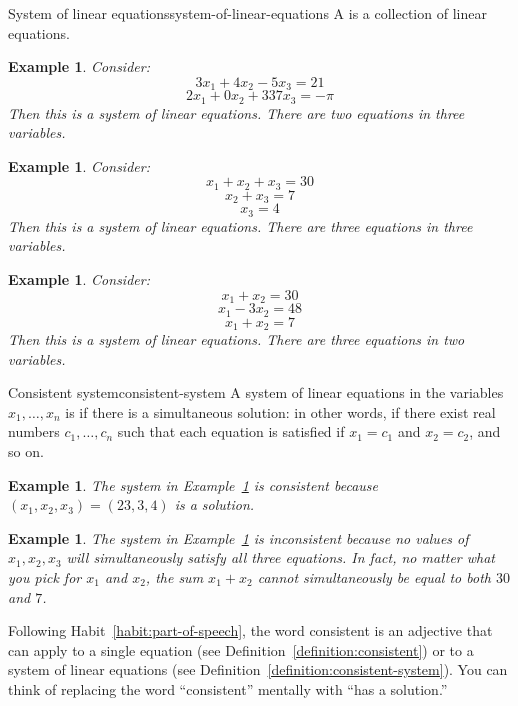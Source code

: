 \documentclass{book}
\newcounter{ekcounter}%
\theoremstyle{ekimcustom}
\newtheorem{example}[ekcounter]{Example}
\newcommand\defn[1]{{\color{blue}{\bf #1}}}
\begin{document}
\begin{bdefinition}{System of linear equations}{system-of-linear-equations}
A \defn{system of linear equations} is a collection of linear equations.
\end{bdefinition}
\begin{example}
Consider:
\[ 3x_1 + 4x_2 - 5x_3 = 21 \]
\[ 2x_1 + 0x_2 + 337x_3 = -\pi \]
Then this is a system of linear equations. There are two equations in three variables.
\end{example}
\begin{example}\label{example:triangular-system}
Consider:
\[ x_1+x_2+x_3= 30 \]
\[ x_2+x_3= 7 \]
\[ x_3= 4 \]
Then this is a system of linear equations. There are three equations in three variables.
\end{example}
\begin{example}\label{example:inconsistent}
Consider:
\[ x_1+x_2= 30 \]
\[ x_1-3x_2= 48 \]
\[ x_1+x_2= 7 \]
Then this is a system of linear equations. There are three equations in two variables.
\end{example}

\begin{bdefinition}{Consistent system}{consistent-system}
A system of linear equations in the variables $x_1,\dots,x_n$ is \defn{consistent} if there is a simultaneous solution: in other words, if there exist real numbers $c_1, \dots, c_n$ such that each equation is satisfied if $x_1=c_1$ and $x_2=c_2$, and so on.
\end{bdefinition}
\begin{example}
The system in Example~\ref{example:triangular-system} is consistent because $(x_1,x_2,x_3)=(23,3,4)$ is a solution.
\end{example}
\begin{example}
The system in Example~\ref{example:inconsistent} is inconsistent because no values of $x_1,x_2,x_3$ will simultaneously satisfy all three equations. In fact, no matter what you pick for $x_1$ and $x_2$, the sum $x_1+x_2$ cannot simultaneously be equal to both $30$ and $7$.
\end{example}

Following Habit~\ref{habit:part-of-speech}, the word consistent is an adjective that can apply to a single equation (see Definition~\ref{definition:consistent}) or to a system of linear equations (see Definition~\ref{definition:consistent-system}). You can think of replacing the word ``consistent'' mentally with ``has a solution.''
\end{document}
